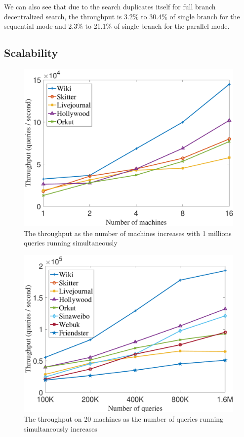 We can also see that due to the search duplicates itself for full branch decentralized search, the throughput is 3.2\% to 30.4\% of single branch for the sequential mode and 2.3\% to 21.1\% of single branch for the parallel mode. 

\subsection{Scalability}
\label{eval_scalability}

\begin{figure}[ht]
    \centering
    \includegraphics[width=\linewidth]{./figures/scale_machine_throughput.pdf}
    \caption{The throughput as the number of machines increases with 1 millions queries running simultaneously}
    \label{fig:scale_machine}
\end{figure}

\begin{figure}[ht]
    \centering
    \includegraphics[width=\linewidth]{./figures/scale_query_throughput.pdf}
    \caption{The throughput on 20 machines as the number of queries running simultaneously increases}
    \label{fig:scale_query}
\end{figure}

